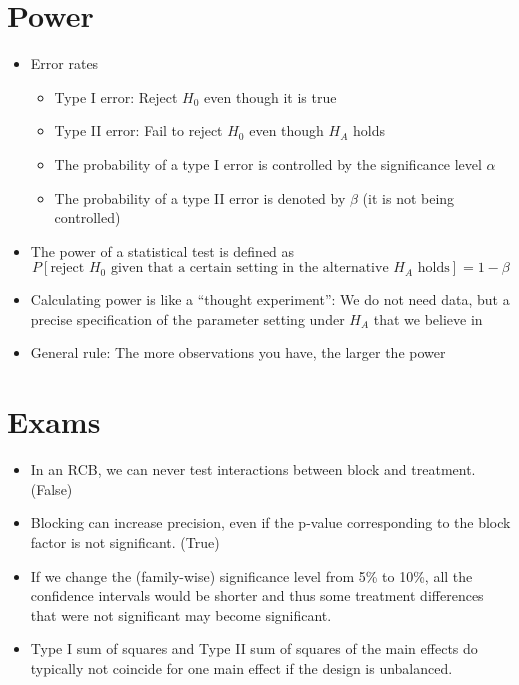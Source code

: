\documentclass[a4paper]{article}
\begin{document}
\section{Power}
\begin{itemize}
    \item Error rates
    \begin{itemize}
        \item Type I error: Reject $H_0$ even though it is true
        \item Type II error: Fail to reject $H_0$ even though $H_A$ holds
        \item The probability of a type I error is controlled by the significance level $\alpha$
        \item The probability of a type II error is denoted by $\beta$ (it is not being controlled)
    \end{itemize}
    \item The power of a statistical test is defined as
    \[P[\textrm{reject $H_0$ given that a certain setting in the alternative $H_A$ holds}]=1-\beta \]
    \item Calculating power is like a ``thought experiment'': We do not need data, but a precise specification of the parameter setting under $H_A$ that we believe in
    \item General rule: The more observations you have, the larger the power
\end{itemize}

\section{Exams}
\begin{itemize}
    \item In an RCB, we can never test interactions between block and treatment. (False)
    \item Blocking can increase precision, even if the p-value corresponding to the block factor is not significant. (True)
    \item If we change the (family-wise) significance level from 5\% to 10\%, all the confidence intervals would be shorter and thus some treatment differences that were not significant may become significant.
    \item Type I sum of squares and Type II sum of squares of the main effects do typically not coincide for one main effect if the design is unbalanced.
\end{itemize}
\end{document}
